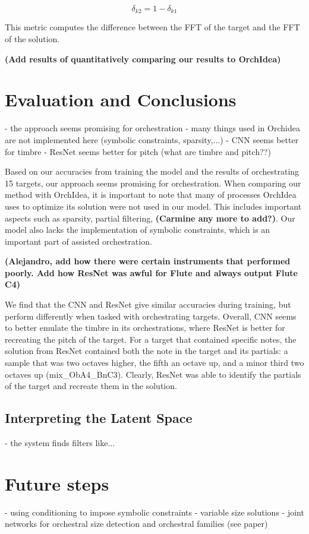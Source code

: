\documentclass{article}
\begin{document}
$$ \delta_{k2} = 1 - \delta_{k1}$$

This metric computes the difference between the FFT of the target and the FFT of the solution. 

\textbf{(Add results of quantitatively comparing our results to OrchIdea)}

\section{Evaluation and Conclusions}
- the approach seems promising for orchestration
- many things used in Orchidea are not implemented here (symbolic constraints, sparsity,...)
- CNN seems better for timbre
- ResNet seems better for pitch (what are timbre and pitch??)

Based on our accuracies from training the model and the results of orchestrating 15 targets, our approach seems promising for orchestration. When comparing our method with OrchIdea, it is important to note that many of processes OrchIdea uses to optimize its solution were not used in our model. This includes important aspects such as sparsity, partial filtering, \textbf{(Carmine any more to add?)}. Our model also lacks the implementation of symbolic constraints, which is an important part of assisted orchestration.

\textbf{(Alejandro, add how there were certain instruments that performed poorly. Add how ResNet was awful for Flute and always output Flute C4)}

We find that the CNN and ResNet give similar accuracies during training, but perform differently when tasked with orchestrating targets. Overall, CNN seems to better emulate the timbre in its orchestrations, where ResNet is better for recreating the pitch of the target. For a target that contained specific notes, the solution from ResNet contained both the note in the target and its partials: a sample that was two octaves higher, the fifth an octave up, and a minor third two octaves up (mix\_ObA4\_BnC3). Clearly, ResNet was able to identify the partials of the target and recreate them in the solution.

\subsection{Interpreting the Latent Space}
- the system finds filters like...

\section{Future steps}
- using conditioning to impose symbolic constraints
- variable size solutions
- joint networks for orchestral size detection and orchestral families (see paper)
\end{document}
